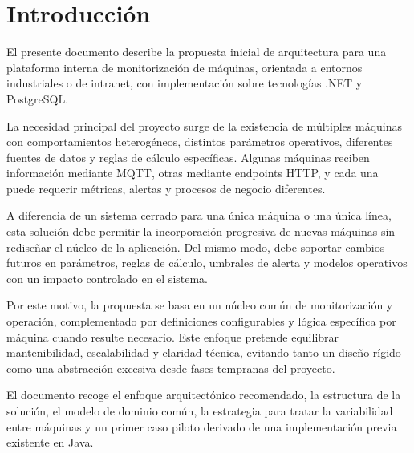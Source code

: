 \section{Introducción}

El presente documento describe la propuesta inicial de arquitectura para una plataforma interna de monitorización de máquinas, orientada a entornos industriales o de intranet, con implementación sobre tecnologías .NET y PostgreSQL.

La necesidad principal del proyecto surge de la existencia de múltiples máquinas con comportamientos heterogéneos, distintos parámetros operativos, diferentes fuentes de datos y reglas de cálculo específicas. Algunas máquinas reciben información mediante MQTT, otras mediante endpoints HTTP, y cada una puede requerir métricas, alertas y procesos de negocio diferentes.

A diferencia de un sistema cerrado para una única máquina o una única línea, esta solución debe permitir la incorporación progresiva de nuevas máquinas sin rediseñar el núcleo de la aplicación. Del mismo modo, debe soportar cambios futuros en parámetros, reglas de cálculo, umbrales de alerta y modelos operativos con un impacto controlado en el sistema.

Por este motivo, la propuesta se basa en un núcleo común de monitorización y operación, complementado por definiciones configurables y lógica específica por máquina cuando resulte necesario. Este enfoque pretende equilibrar mantenibilidad, escalabilidad y claridad técnica, evitando tanto un diseño rígido como una abstracción excesiva desde fases tempranas del proyecto.

El documento recoge el enfoque arquitectónico recomendado, la estructura de la solución, el modelo de dominio común, la estrategia para tratar la variabilidad entre máquinas y un primer caso piloto derivado de una implementación previa existente en Java.